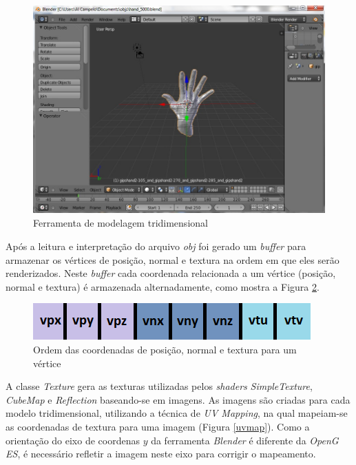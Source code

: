 	\begin{figure}[ht]
	\centering
		\includegraphics[keepaspectratio=true,scale=0.7]{figuras/blender.jpg}
	\caption{Ferramenta de modelagem tridimensional}
	\label{blender}
	\end{figure}

	Após a leitura e interpretação do arquivo \textit{obj} foi gerado um \textit{buffer} para armazenar os vértices de posição, normal e textura na ordem em que eles serão renderizados. Neste \textit{buffer} cada coordenada relacionada a um vértice (posição, normal e textura) é armazenada alternadamente, como mostra a Figura \ref{buffer}.

	\begin{figure}[ht]
	\centering
		\includegraphics[keepaspectratio=true,scale=1.0]{figuras/buffer.png}
	\caption{Ordem das coordenadas de posição, normal e textura para um vértice}
	\label{buffer}
	\end{figure}

	A classe \textit{Texture} gera as texturas utilizadas pelos \textit{shaders} \textit{SimpleTexture}, \textit{CubeMap} e \textit{Reflection} baseando-se em imagens. As imagens são criadas para cada modelo tridimensional, utilizando a técnica de \textit{UV Mapping}, na qual mapeiam-se as coordenadas de textura para uma imagem (Figura \ref{uvmap}). Como a orientação do eixo de coordenas $y$ da ferramenta \textit{Blender} é diferente da \textit{OpenG ES}, é necessário refletir a imagem neste eixo para corrigir o mapeamento.

